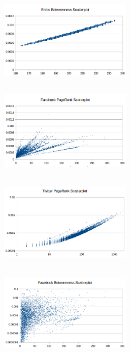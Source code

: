 \documentclass[spanish]{assignment}
\begin{document}
\begin{figure}[ht!]
\begin{subfigure}[t!]{0.5\textwidth}
\begin{subfigure}[t!]{\textwidth}
				\end{subfigure}
				\begin{subfigure}[t!]{\textwidth}
					\centering
					\includegraphics[width=180pt, height=120pt]{img/erdos_b_s.png}
				\end{subfigure}
			\end{subfigure}
			\begin{subfigure}[t!]{0.5\textwidth}
				\begin{subfigure}[t!]{\textwidth}
					\centering
					\includegraphics[width=180pt, height=120pt]{img/facebook_pr_s.png}
				\end{subfigure}
				\begin{subfigure}[t!]{\textwidth}
					\centering
					\includegraphics[width=180pt, height=120pt]{img/twitter_pr_s.png}
				\end{subfigure}
			\end{subfigure}
			\begin{subfigure}[t!]{0.5\textwidth}
				\begin{subfigure}[t!]{\textwidth}
					\centering
					\includegraphics[width=180pt, height=120pt]{img/facebook_b_s.png}

\end{subfigure}
\end{subfigure}
\end{figure}
\end{document}
